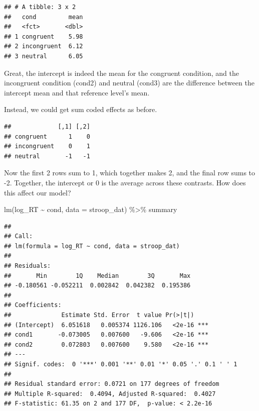\documentclass[
]{book}
\newenvironment{Shaded}{\begin{snugshade}}{\end{snugshade}}
\newcommand{\AttributeTok}[1]{\textcolor[rgb]{0.77,0.63,0.00}{#1}}
\newcommand{\FunctionTok}[1]{\textcolor[rgb]{0.00,0.00,0.00}{#1}}
\newcommand{\NormalTok}[1]{#1}
\newcommand{\OtherTok}[1]{\textcolor[rgb]{0.56,0.35,0.01}{#1}}
\newcommand{\SpecialCharTok}[1]{\textcolor[rgb]{0.00,0.00,0.00}{#1}}
\begin{document}
\begin{verbatim}
## # A tibble: 3 x 2
##   cond         mean
##   <fct>       <dbl>
## 1 congruent    5.98
## 2 incongruent  6.12
## 3 neutral      6.05
\end{verbatim}

Great, the intercept is indeed the mean for the congruent condition, and the incongruent condition (cond2) and neutral (cond3) are the difference between the intercept mean and that reference level's mean.

Instead, we could get sum coded effects as before.

\begin{Shaded}
\end{Shaded}

\begin{verbatim}
##             [,1] [,2]
## congruent      1    0
## incongruent    0    1
## neutral       -1   -1
\end{verbatim}

Now the first 2 rows sum to 1, which together makes 2, and the final row sums to -2. Together, the intercept or 0 is the average across these contrasts. How does this affect our model?

\begin{Shaded}
\begin{Highlighting}[]
\FunctionTok{lm}\NormalTok{(log\_RT }\SpecialCharTok{\textasciitilde{}}\NormalTok{ cond, }\AttributeTok{data =}\NormalTok{ stroop\_dat) }\SpecialCharTok{\%\textgreater{}\%}\NormalTok{ summary}
\end{Highlighting}
\end{Shaded}

\begin{verbatim}
## 
## Call:
## lm(formula = log_RT ~ cond, data = stroop_dat)
## 
## Residuals:
##       Min        1Q    Median        3Q       Max 
## -0.180561 -0.052211  0.002842  0.042382  0.195386 
## 
## Coefficients:
##              Estimate Std. Error  t value Pr(>|t|)    
## (Intercept)  6.051618   0.005374 1126.106   <2e-16 ***
## cond1       -0.073005   0.007600   -9.606   <2e-16 ***
## cond2        0.072803   0.007600    9.580   <2e-16 ***
## ---
## Signif. codes:  0 '***' 0.001 '**' 0.01 '*' 0.05 '.' 0.1 ' ' 1
## 
## Residual standard error: 0.0721 on 177 degrees of freedom
## Multiple R-squared:  0.4094, Adjusted R-squared:  0.4027 
## F-statistic: 61.35 on 2 and 177 DF,  p-value: < 2.2e-16
\end{verbatim}
\end{document}
